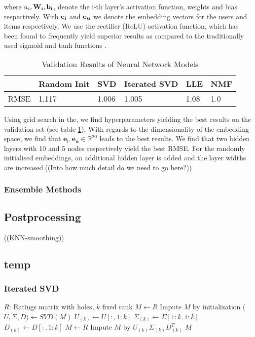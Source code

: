 \documentclass[10pt,conference,compsocconf]{IEEEtran}
\begin{document}
where $a_i,\bf{W_i}, \bf{b_i}$, denote the i-th layer's activation function, weights and bias respectively. With $\bf{e_i}$ and $\bf{e_u}$ we denote the embedding vectors for the users and items respectively. We use the rectifier (ReLU) activation function, which has been found to frequently yield superior results as compared to the traditionally used sigmoid and tanh functions \cite{glorot2011deep}.


\begin{table}[]
\centering
\caption{Validation Results of Neural Network Models}
\label{table:neural_net_models}
\begin{tabular}{|l|l|l|l|l|l|}
\hline
     & Random Init & SVD & Iterated SVD & LLE & NMF \\ \hline
RMSE & 1.117           & 1.006   & 1.005           & 1.08   & 1.0   \\ \hline
\end{tabular}
\end{table}

Using grid search in the, we find hyperparameters yielding the best results on the validation set (see table \ref{table:neural_net_models}). 
With regards to the dimensionality of the embedding space, we find that $\mathbf{e_i}, \mathbf{e_u} \in  \mathbb{R}^{20}$ leads to the best results. We find that two hidden layers with 10 and 5 nodes respectively yield the best RMSE. For the randomly initialised embeddings, an additional hidden layer is added and the layer widths are increased.((Into how much detail do we need to go here?))




\subsubsection{Ensemble Methods}

\subsection{Postprocessing}
((KNN-smoothing))

\subsection{temp}
\subsubsection{Iterated SVD}
\begin{algorithmic}
	\STATE $R$: Ratings matrix with holes, $k$ fixed rank
	\STATE $M \leftarrow R$
	\STATE Impute $M$ by initialization
    	\STATE ($U, \Sigma, D) \leftarrow SVD(M)$
    	\STATE $U_{(k)} \leftarrow U[:, 1:k]$
    	\STATE $\Sigma_{(k)} \leftarrow \Sigma[1:k, 1:k]$
    	\STATE $D_{(k)} \leftarrow D[:, 1:k]$
    	\STATE $M \leftarrow R$
    	\STATE Impute $M$ by $U_{(k)} \Sigma_{(k)} D_{(k)}^T$
    \ENDFOR
    \RETURN $M$
\end{algorithmic}
\end{document}
